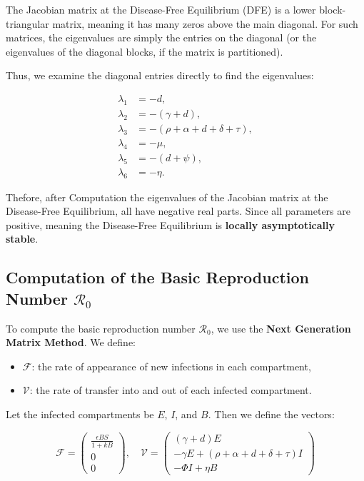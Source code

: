 \documentclass[a4paper,12pt]{report}
\begin{document}
\begin{itemize}
The Jacobian matrix at the Disease-Free Equilibrium (DFE) is a lower block-triangular matrix, meaning it has many zeros above the main diagonal. For such matrices, the eigenvalues are simply the entries on the diagonal (or the eigenvalues of the diagonal blocks, if the matrix is partitioned).

Thus, we examine the diagonal entries directly to find the eigenvalues:

\[
\begin{aligned}
\lambda_1 &= -d, \\
\lambda_2 &= -(\gamma + d), \\
\lambda_3 &= -(\rho + \alpha + d + \delta + \tau), \\
\lambda_4 &= -\mu, \\
\lambda_5 &= -(d + \psi), \\
\lambda_6 &= -\eta.
\end{aligned}
\]

Thefore, after Computation the eigenvalues of the Jacobian matrix at the Disease-Free Equilibrium, all  have negative real parts.
Since all parameters are positive,  meaning the Disease-Free Equilibrium  is \textbf{locally asymptotically stable}.

\subsection{Computation of the Basic Reproduction Number \(\mathcal{R}_0\)}

To compute the basic reproduction number \(\mathcal{R}_0\), we use the \textbf{Next Generation Matrix Method}. We define:

\begin{itemize}
    \item \(\mathcal{F}\): the rate of appearance of new infections in each compartment,
    \item \(\mathcal{V}\): the rate of transfer into and out of each infected compartment.
\end{itemize}

Let the infected compartments be \(E\), \(I\), and \(B\). Then we define the vectors:

\[
\mathcal{F} =
\begin{pmatrix}
\frac{\epsilon B S}{1 + k B} \\
0 \\
0
\end{pmatrix},
\quad
\mathcal{V} =
\begin{pmatrix}
(\gamma + d)E \\
- \gamma E + (\rho + \alpha + d + \delta + \tau) I \\
- \Phi I + \eta B
\end{pmatrix}
\]


\end{itemize}
\end{document}
